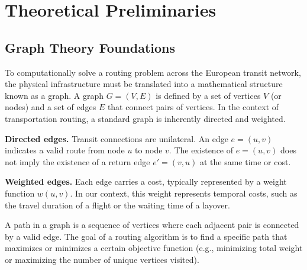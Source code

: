 \chapter{Theoretical Preliminaries}
\label{chap:preliminaries}

\section{Graph Theory Foundations}
\label{sec:graph_theory}

To computationally solve a routing problem across the European transit network, the physical infrastructure must be translated into a mathematical structure known as a graph. A graph $G = (V, E)$ is defined by a set of vertices $V$ (or nodes) and a set of edges $E$ that connect pairs of vertices.
In the context of transportation routing, a standard graph is inherently directed and weighted.

\medskip

\textbf{Directed edges.}
Transit connections are unilateral. An edge $e = (u, v)$ indicates a valid route from node $u$ to node $v$. The existence of $e = (u, v)$ does not imply the existence of a return edge $e' = (v, u)$ at the same time or cost.

\textbf{Weighted edges.}
Each edge carries a cost, typically represented by a weight function $w(u, v)$. In our context, this weight represents temporal costs, such as the travel duration of a flight or the waiting time of a layover.

\medskip

A path in a graph is a sequence of vertices where each adjacent pair is connected by a valid edge. The goal of a routing algorithm is to find a specific path that maximizes or minimizes a certain objective function (e.g., minimizing total weight or maximizing the number of unique vertices visited).

